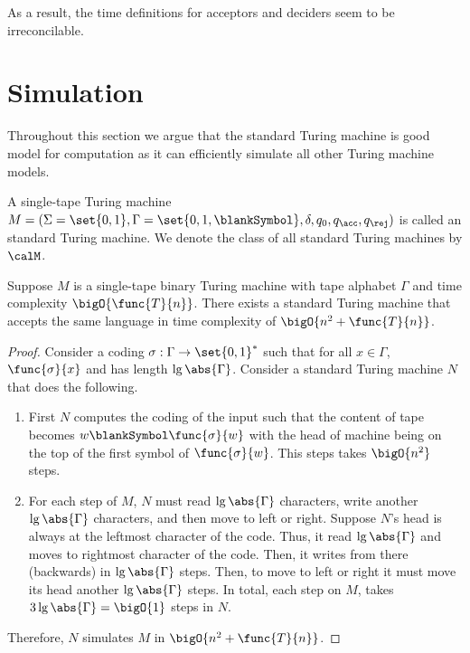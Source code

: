 As a result, the time definitions for acceptors and deciders seem to be irreconcilable. 
\section{Simulation}
Throughout this section we argue that the standard Turing machine is good model for computation as it can efficiently simulate all other Turing machine models. 
\begin{definition}
    A single-tape Turing machine \(M = (\Sigma = \set{0,1},\Gamma=\set{0,1,\blankSymbol},\delta,q_0,q_{\acc}, q_{\rej})\) is called an standard Turing machine. We denote the class of all standard Turing machines by \(\calM\).
\end{definition}

\begin{theorem}
    Suppose \(M\) is a single-tape binary Turing machine with tape alphabet \(\Gamma\) and time complexity \(\bigO{\func{T}{n}}\). There exists a standard Turing machine that accepts the same language in time complexity of \(\bigO{n^2 + \func{T}{n}}\).
\end{theorem}

\begin{proof}
    Consider a coding \(\sigma : \Gamma \to \set{0,1}^{\ast}\) such that for all \(x \in \Gamma\), \(\func{\sigma}{x}\) and has length \(\lg \abs{\Gamma}\). Consider a standard Turing machine \(N\) that does the following.
    \begin{enumerate}
        \item First \(N\) computes the coding of the input such that the content of tape becomes \(w \blankSymbol \func{\sigma}{w}\) with the head of machine being on the top of the first symbol of \(\func{\sigma}{w}\). This steps takes \(\bigO{n^2}\) steps.
        \item For each step of \(M\), \(N\) must read \(\lg \abs{\Gamma}\) characters, write another \(\lg \abs{\Gamma}\) characters, and then move to left or right. Suppose \(N\)'s head is always at the leftmost character of the code. Thus, it read \(\lg \abs{\Gamma}\) and moves to rightmost character of the code. Then, it writes from there (backwards) in \(\lg \abs{\Gamma}\) steps. Then, to move to left or right it must move its head another \(\lg \abs{\Gamma}\) steps. In total, each step on \(M\), takes \(3 \lg \abs{\Gamma} = \bigO{1}\) steps in \(N\).
    \end{enumerate}
    Therefore, \(N\) simulates \(M\) in \(\bigO{n^2 + \func{T}{n}}\).
\end{proof}

